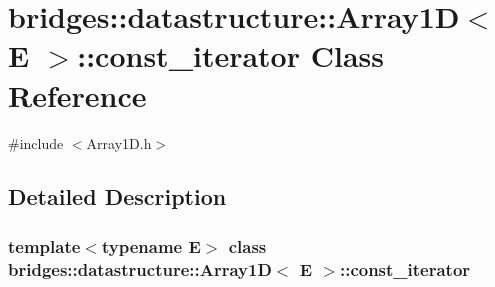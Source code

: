 \hypertarget{classbridges_1_1datastructure_1_1_array1_d_1_1const__iterator}{}\section{bridges\+:\+:datastructure\+:\+:Array1D$<$ E $>$\+:\+:const\+\_\+iterator Class Reference}
\label{classbridges_1_1datastructure_1_1_array1_d_1_1const__iterator}


{\ttfamily \#include $<$Array1\+D.\+h$>$}



\subsection{Detailed Description}
\subsubsection*{template$<$typename E$>$\newline
class bridges\+::datastructure\+::\+Array1\+D$<$ E $>$\+::const\+\_\+iterator}


